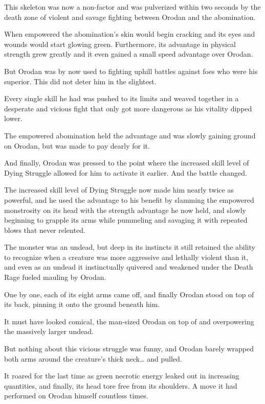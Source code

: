 \documentclass[a4paper,10pt]{book}
\begin{document}
This skeleton was now a non-factor and was pulverized within two seconds by the death zone of violent and savage fighting between Orodan and the abomination.\par
When empowered the abomination’s skin would begin cracking and its eyes and wounds would start glowing green. Furthermore, its advantage in physical strength grew greatly and it even gained a small speed advantage over Orodan.\par
But Orodan was by now used to fighting uphill battles against foes who were his superior. This did not deter him in the slightest.\par
Every single skill he had was pushed to its limits and weaved together in a desperate and vicious fight that only got more dangerous as his vitality dipped lower.\par
The empowered abomination held the advantage and was slowly gaining ground on Orodan, but was made to pay dearly for it.\par
And finally, Orodan was pressed to the point where the increased skill level of Dying Struggle allowed for him to activate it earlier. And the battle changed.\par
The increased skill level of Dying Struggle now made him nearly twice as powerful, and he used the advantage to his benefit by slamming the empowered monstrosity on its head with the strength advantage he now held, and slowly beginning to grapple its arms while pummeling and savaging it with repeated blows that never relented.\par
The monster was an undead, but deep in its instincts it still retained the ability to recognize when a creature was more aggressive and lethally violent than it, and even as an undead it instinctually quivered and weakened under the Death Rage fueled mauling by Orodan.\par
One by one, each of its eight arms came off, and finally Orodan stood on top of its back, pinning it onto the ground beneath him.\par
It must have looked comical, the man-sized Orodan on top of and overpowering the massively larger undead.\par
But nothing about this vicious struggle was funny, and Orodan barely wrapped both arms around the creature’s thick neck… and pulled.\par
It roared for the last time as green necrotic energy leaked out in increasing quantities, and finally, its head tore free from its shoulders. A move it had performed on Orodan himself countless times.\par
\end{document}
